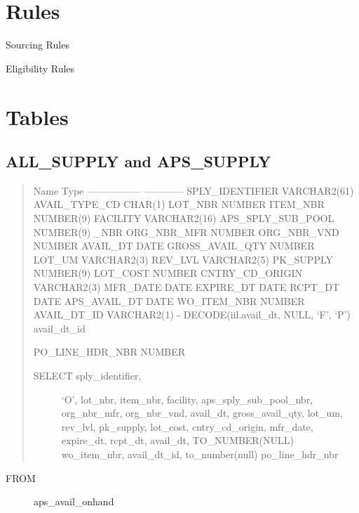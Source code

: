 \documentclass[letterpaper,10pt,english]{sphinxmanual}
\begin{document}
\chapter{Rules}
\label{APS/RulesData:rules}\label{APS/RulesData::doc}
Sourcing Rules

Eligibility Rules


\chapter{Tables}
\label{APS/Supply:tables}\label{APS/Supply::doc}

\section{ALL\_SUPPLY and APS\_SUPPLY}
\label{APS/Supply:all-supply-and-aps-supply}\begin{quote}

Name                  Type
----------------- ------------
SPLY\_IDENTIFIER   VARCHAR2(61)
AVAIL\_TYPE\_CD     CHAR(1)
LOT\_NBR                   NUMBER
ITEM\_NBR                  NUMBER(9)
FACILITY                  VARCHAR2(16)
APS\_SPLY\_SUB\_POOL NUMBER(9)
\_NBR
ORG\_NBR\_MFR                NUMBER
ORG\_NBR\_VND                NUMBER
AVAIL\_DT                   DATE
GROSS\_AVAIL\_QTY            NUMBER
LOT\_UM                     VARCHAR2(3)
REV\_LVL                    VARCHAR2(5)
PK\_SUPPLY                  NUMBER(9)
LOT\_COST                   NUMBER
CNTRY\_CD\_ORIGIN            VARCHAR2(3)
MFR\_DATE                   DATE
EXPIRE\_DT                  DATE
RCPT\_DT                    DATE
APS\_AVAIL\_DT               DATE
WO\_ITEM\_NBR                NUMBER
AVAIL\_DT\_ID                VARCHAR2(1)  -   DECODE(iil.avail\_dt, NULL, `F', `P')       avail\_dt\_id

PO\_LINE\_HDR\_NBR            NUMBER
\begin{description}
\item[{SELECT sply\_identifier,}] \leavevmode
`O',
lot\_nbr,
item\_nbr,
facility,
aps\_sply\_sub\_pool\_nbr,
org\_nbr\_mfr,
org\_nbr\_vnd,
avail\_dt,
gross\_avail\_qty,
lot\_um,
rev\_lvl,
pk\_supply,
lot\_cost,
cntry\_cd\_origin,
mfr\_date,
expire\_dt,
rcpt\_dt,
avail\_dt,
TO\_NUMBER(NULL)     wo\_item\_nbr,
avail\_dt\_id,
to\_number(null) po\_line\_hdr\_nbr

\end{description}
\end{quote}
\begin{description}
\item[{FROM}] \leavevmode
aps\_avail\_onhand

\end{description}
\end{document}
